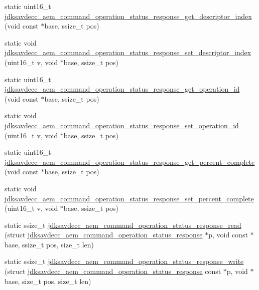\begin{DoxyCompactItemize}
\item 
static uint16\+\_\+t \hyperlink{group__command__operation__status__response_ga85ce9d7460dbf29a9b42eb2f0d17aaf7}{jdksavdecc\+\_\+aem\+\_\+command\+\_\+operation\+\_\+status\+\_\+response\+\_\+get\+\_\+descriptor\+\_\+index} (void const $\ast$base, ssize\+\_\+t pos)
\item 
static void \hyperlink{group__command__operation__status__response_gadd31561203aa11b4e2926d6441e5fd81}{jdksavdecc\+\_\+aem\+\_\+command\+\_\+operation\+\_\+status\+\_\+response\+\_\+set\+\_\+descriptor\+\_\+index} (uint16\+\_\+t v, void $\ast$base, ssize\+\_\+t pos)
\item 
static uint16\+\_\+t \hyperlink{group__command__operation__status__response_gaa364c12763f1e24e3ddd5ee7077bb1ff}{jdksavdecc\+\_\+aem\+\_\+command\+\_\+operation\+\_\+status\+\_\+response\+\_\+get\+\_\+operation\+\_\+id} (void const $\ast$base, ssize\+\_\+t pos)
\item 
static void \hyperlink{group__command__operation__status__response_gabf187e0deff2856d6adc0fd5d6a0ba8b}{jdksavdecc\+\_\+aem\+\_\+command\+\_\+operation\+\_\+status\+\_\+response\+\_\+set\+\_\+operation\+\_\+id} (uint16\+\_\+t v, void $\ast$base, ssize\+\_\+t pos)
\item 
static uint16\+\_\+t \hyperlink{group__command__operation__status__response_gaee60072f938a480f897cc211055d10ec}{jdksavdecc\+\_\+aem\+\_\+command\+\_\+operation\+\_\+status\+\_\+response\+\_\+get\+\_\+percent\+\_\+complete} (void const $\ast$base, ssize\+\_\+t pos)
\item 
static void \hyperlink{group__command__operation__status__response_gab9c1ae236101333d161e404bf948cc1b}{jdksavdecc\+\_\+aem\+\_\+command\+\_\+operation\+\_\+status\+\_\+response\+\_\+set\+\_\+percent\+\_\+complete} (uint16\+\_\+t v, void $\ast$base, ssize\+\_\+t pos)
\item 
static ssize\+\_\+t \hyperlink{group__command__operation__status__response_ga5ceaedceaf06924eec56ff6ea246dd7e}{jdksavdecc\+\_\+aem\+\_\+command\+\_\+operation\+\_\+status\+\_\+response\+\_\+read} (struct \hyperlink{structjdksavdecc__aem__command__operation__status__response}{jdksavdecc\+\_\+aem\+\_\+command\+\_\+operation\+\_\+status\+\_\+response} $\ast$p, void const $\ast$base, ssize\+\_\+t pos, size\+\_\+t len)
\item 
static ssize\+\_\+t \hyperlink{group__command__operation__status__response_ga89605ff057dba10da9898969c086881b}{jdksavdecc\+\_\+aem\+\_\+command\+\_\+operation\+\_\+status\+\_\+response\+\_\+write} (struct \hyperlink{structjdksavdecc__aem__command__operation__status__response}{jdksavdecc\+\_\+aem\+\_\+command\+\_\+operation\+\_\+status\+\_\+response} const $\ast$p, void $\ast$base, size\+\_\+t pos, size\+\_\+t len)
\end{DoxyCompactItemize}


